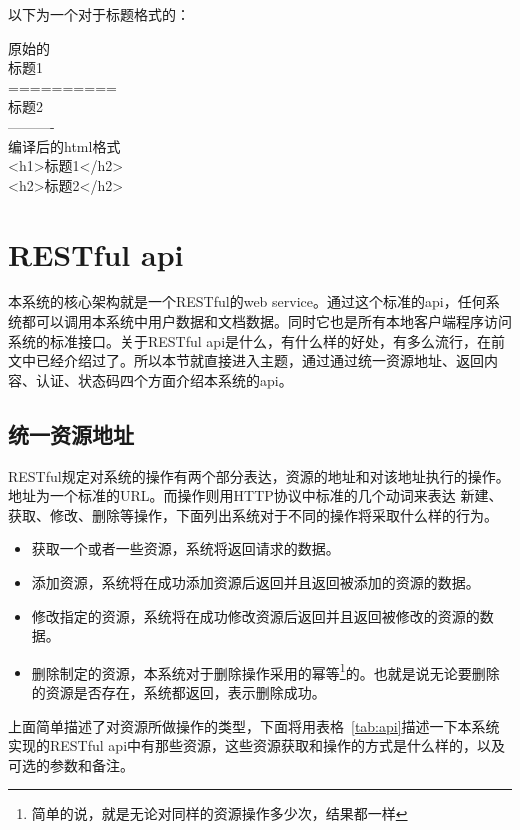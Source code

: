 以下为一个对于标题格式的：
\begin{bframe}
  原始的\\
         标题1\\
         ==========\\
         标题2\\
         ----------  \\
 编译后的html格式\\
        <h1>标题1</h2>\\
        <h2>标题2</h2>\\
\end{bframe}

\section{RESTful api}
\label{sec:apitable}

本系统的核心架构就是一个RESTful的web service。通过这个标准的api，任何系统都可以调用本系统中用户数据和文档数据。同时它也是所有本地客户端程序访问系统的标准接口。关于RESTful api是什么，有什么样的好处，有多么流行，在前文中已经介绍过了。所以本节就直接进入主题，通过通过统一资源地址、返回内容、认证、状态码四个方面介绍本系统的api。
\subsection{统一资源地址}
\label{sec:researchurl}
RESTful规定对系统的操作有两个部分表达，资源的地址和对该地址执行的操作。地址为一个标准的URL。而操作则用HTTP协议中标准的几个动词来表达 新建、获取、修改、删除等操作，下面列出系统对于不同的操作将采取什么样的行为。
\begin{itemize}
\item {} 获取一个或者一些资源，系统将返回请求的数据。
\item {} 添加资源，系统将在成功添加资源后返回并且返回被添加的资源的数据。
\item {} 修改指定的资源，系统将在成功修改资源后返回并且返回被修改的资源的数据。
\item {} 删除制定的资源，本系统对于删除操作采用的幂等\footnote{简单的说，就是无论对同样的资源操作多少次，结果都一样}的。也就是说无论要删除的资源是否存在，系统都返回，表示删除成功。
\end{itemize}


上面简单描述了对资源所做操作的类型，下面将用表格~\ref{tab:api}描述一下本系统实现的RESTful api中有那些资源，这些资源获取和操作的方式是什么样的，以及可选的参数和备注。


